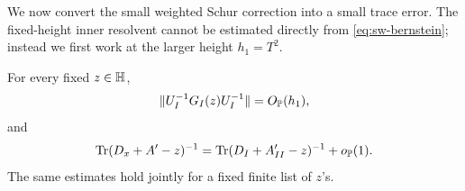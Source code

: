 We now convert the small weighted Schur correction into a small trace
error. The fixed-height inner resolvent cannot be estimated directly from
\eqref{eq:sw-bernstein}; instead we first work at the larger height \(h_1=T^2\).

\begin{lemma}\label{sw:trace-cut}
For every fixed \(z\in\mathbb H\),
\begin{equation}\label{eq:sw-inner-resolvent}
 \|U_I^{-1}G_I(z)U_I^{-1}\|=O_{\mathbb P}(h_1),
\end{equation}
and
\begin{equation}\label{eq:sw-second-cut}
 \operatorname{Tr}(D_x+A'-z)^{-1}
 =\operatorname{Tr}(D_I+A'_{II}-z)^{-1}+o_{\mathbb P}(1).
\end{equation}
The same estimates hold jointly for a fixed finite list of \(z\)'s.
\end{lemma}

